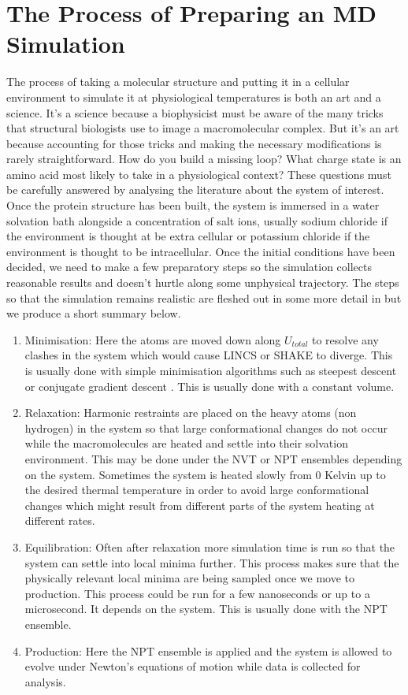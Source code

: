 	\section{The Process of Preparing an MD Simulation}
	The process of taking a molecular structure and putting it in a cellular environment to simulate it at physiological temperatures is both an art and a science. It's a science because a biophysicist must be aware of the many tricks that structural biologists use to image a macromolecular complex. But it's an art because accounting for those tricks and making the necessary modifications is rarely straightforward. How do you build a missing loop? What charge state is an amino acid most likely to take in a physiological context? These questions must be carefully answered by analysing the literature about the system of interest. Once the protein structure has been built, the system is immersed in a water solvation bath alongside a concentration of salt ions, usually sodium chloride if the environment is thought at be extra cellular or potassium chloride if the environment is thought to be intracellular. Once the initial conditions have been decided, we need to make a few preparatory steps so the simulation collects reasonable results and doesn't hurtle along some unphysical trajectory. The steps so that the simulation remains realistic are fleshed out in some more detail in \cite{braun2019} but we produce a short summary below.

	\begin{enumerate}
		\item Minimisation: Here the atoms are moved down along $U_{total}$ to resolve any clashes  in the system which would cause LINCS or SHAKE to diverge. This is usually done with simple minimisation algorithms such as steepest descent or conjugate gradient descent \cite{leach2001}. This is usually done with a constant volume. 
	\item Relaxation: Harmonic restraints are placed on the heavy atoms (non hydrogen) in the system so that large conformational changes do not occur while the macromolecules are heated and settle into their solvation environment. This may be done under the NVT or NPT ensembles depending on the system. Sometimes the system is heated slowly from 0 Kelvin up to the desired thermal temperature in order to avoid large conformational changes which might result from different parts of the system heating at different rates. 
\item Equilibration: Often after relaxation more simulation time is run so that the system can settle into local minima further. This process makes sure that the physically relevant local minima are being sampled once we move to production. This process could be run for a few nanoseconds or up to a microsecond. It depends on the system. This is usually done with the NPT ensemble.
\item Production: Here the NPT ensemble is applied and the system is allowed to evolve under Newton's equations of motion while data is collected for analysis.
\end{enumerate}


